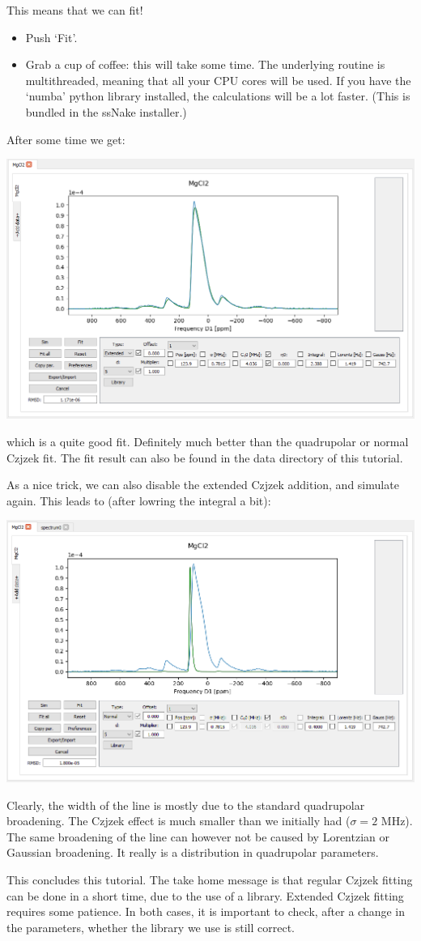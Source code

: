\documentclass[11pt,a4paper]{article}
\begin{document}
This means that we can fit!
\begin{itemize}
  \item Push `Fit'.
  \item Grab a cup of coffee: this will take some time. The underlying routine is multithreaded, meaning that all your CPU cores will be used. If you have the `numba' python library installed, the calculations will be a lot faster. (This is bundled in the ssNake installer.)
\end{itemize}
After some time we get:
\begin{center}
\includegraphics[width=0.8\linewidth]{Figs/fig12.PNG}
\end{center}
which is a quite good fit. Definitely much better than the quadrupolar or normal Czjzek fit. The fit result can also be found in the data directory of this tutorial.

As a nice trick, we can also disable the extended Czjzek addition, and simulate again. This leads to (after lowring the integral a bit):
\begin{center}
\includegraphics[width=0.8\linewidth]{Figs/fig13.PNG}
\end{center}
Clearly, the width of the line is mostly due to the standard quadrupolar broadening. The Czjzek effect is much smaller than we initially had ($\sigma=2$ MHz). The same broadening of the line can however not be caused by Lorentzian or Gaussian broadening. It really is a distribution in quadrupolar parameters.

This concludes this tutorial. The take home message is that regular Czjzek fitting can be done in a short time, due to the use of a library. Extended Czjzek fitting requires some patience. In both cases, it is important to check, after a change in the parameters, whether the library we use is still correct.
\end{document}
